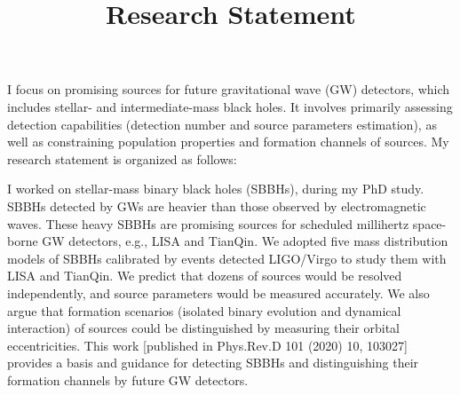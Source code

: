 \documentclass[12pt,a4paper,sans]{article}%
\title{\vspace{-2.5cm}\Huge Research Statement \vspace{-2.2em}}
\date{}
\begin{document}
\maketitle

I focus on promising sources for future gravitational wave (GW) detectors, which includes stellar- and
intermediate-mass black holes. It involves primarily assessing detection capabilities (detection number and source
parameters estimation), as well as constraining population properties and formation channels of sources. My research statement is organized as
follows:  

I worked on stellar-mass binary black holes (SBBHs), during my PhD study. SBBHs detected by GWs are heavier than those observed by electromagnetic waves. These heavy SBBHs are promising sources for scheduled
millihertz space-borne GW detectors, e.g., LISA and TianQin. We adopted five mass
distribution models of SBBHs calibrated by events detected LIGO/Virgo to study them with LISA and TianQin. We predict
that dozens of sources would be resolved independently, and source parameters
would be measured accurately. We also argue that formation scenarios (isolated binary evolution and dynamical interaction) of sources
could be distinguished by measuring their orbital eccentricities. This work [published in Phys.Rev.D 101 (2020) 10, 103027] provides a basis and guidance for detecting SBBHs and distinguishing their formation channels by future GW detectors. 
\end{document}
